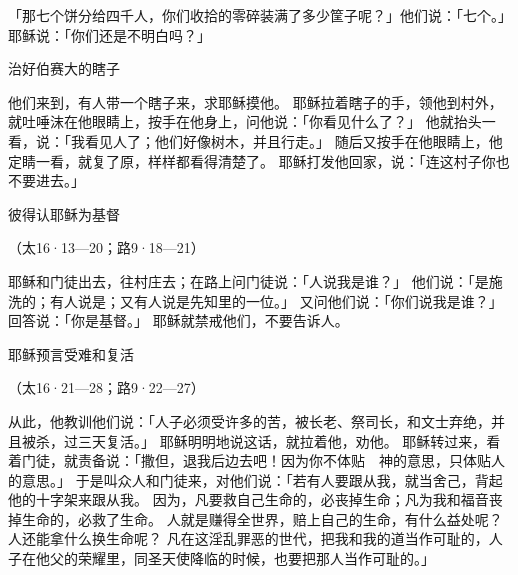 {「{}那七个饼分给四千人，你们收拾的零碎装满了多少筐子呢？」他们说：「七个。」
耶稣说：「你们还是不明白吗？」
\par }{\SH 治好伯赛大的瞎子
\par }{\PP {}他们来到{}，有人带一个瞎子来，求耶稣摸他。
耶稣拉着瞎子的手，领他到村外，就吐唾沫在他眼睛上，按手在他身上，问他说：「你看见什么了？」
他就抬头一看，说：「我看见人了；他们好像树木，并且行走。」
随后又按手在他眼睛上，他定睛一看，就复了原，样样都看得清楚了。
耶稣打发他回家，说：「连这村子你也不要进去。」
\par }{\SH 彼得认耶稣为基督
\par }{\R （太16·13—20；路9·18—21）
\par }{\PP {}耶稣和门徒出去，往{}村庄去；在路上问门徒说：「人说我是谁？」
他们说：「{}是施洗的{}；有人说是{}；又有人说是先知里的一位。」
又问他们说：「你们说我是谁？」{}回答说：「你是基督。」
耶稣就禁戒他们，不要告诉人。
\par }{\SH 耶稣预言受难和复活
\par }{\R （太16·21—28；路9·22—27）
\par }{\PP {}从此，他教训他们说：「人子必须受许多的苦，被长老、祭司长，和文士弃绝，并且被杀，过三天复活。」
耶稣明明地说这话，{}就拉着他，劝他。
耶稣转过来，看着门徒，就责备{}说：「撒但，退我后边去吧！因为你不体贴　神的意思，只体贴人的意思。」
于是叫众人和门徒来，对他们说：「若有人要跟从我，就当舍己，背起他的十字架来跟从我。
因为，凡要救自己生命的，必丧掉生命；凡为我和福音丧掉生命的，必救了生命。
人就是赚得全世界，赔上自己的生命，有什么益处呢？
人还能拿什么换生命呢？
凡在这淫乱罪恶的世代，把我和我的道当作可耻的，人子在他父的荣耀里，同圣天使降临的时候，也要把那人当作可耻的。」

}
